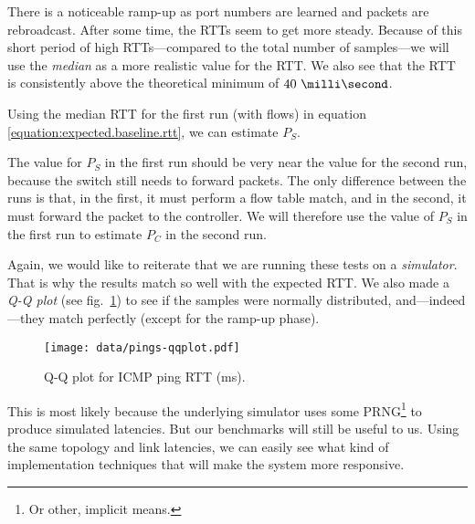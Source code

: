 

There is a noticeable ramp-up as port numbers are learned and packets are
rebroadcast.  After some time, the \acs{RTT}s seem to get more steady.
Because of this short period of high \acs{RTT}s---compared to the total number of
samples---we will use the \textit{median} as a more realistic value for the
RTT. We also see that the RTT is consistently above the theoretical minimum
of $\ms{40}$.

Using the median RTT for the first run (with flows)
in equation \ref{equation:expected.baseline.rtt}, we can estimate $P_S$.



The value for $P_S$ in the first run should be very near the value for the
second run, because the switch still needs to forward packets.  The only
difference between the runs is that, in the first, it must perform a flow
table match, and in the second, it must forward the packet to the
controller.  We will therefore use the value of $P_S$ in the first run to
estimate $P_C$ in the second run.



Again, we would like to reiterate that we are running these tests on a
\textit{simulator}.  That is why the results match so well with the expected
\acs{RTT}.  We also made a \textit{Q-Q plot} (see
fig.~\ref{figure:pings.qqplot}) to see if the samples were normally
distributed, and---indeed---they match perfectly (except for the ramp-up
phase).

\begin{figure}
  \centering
  \texttt{[image: data/pings-qqplot.pdf]}
  \caption{Q-Q plot for ICMP ping RTT (ms).}
  \label{figure:pings.qqplot}
\end{figure}

This is most likely because the underlying simulator uses some
\acf{PRNG}\footnote{Or other, implicit means.} to produce simulated latencies.  But our
benchmarks will still be useful to us.  Using the same topology and link
latencies, we can easily see what kind of implementation techniques that
will make the system more responsive.

